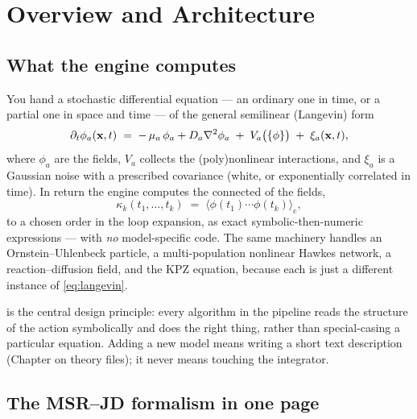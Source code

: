 \chapter{Overview and Architecture}
\label{ch:overview}

\section{What the engine computes}

You hand \Daedalus{} a stochastic differential equation --- an ordinary one in
time, or a partial one in space and time --- of the general semilinear
(Langevin) form
\begin{equation}
  \partial_t \phi_a(\mathbf x,t)
   \;=\; -\,\mu_a\,\phi_a + D_a \nabla^2 \phi_a
          \;+\; V_a\big(\{\phi\}\big) \;+\; \xi_a(\mathbf x,t),
  \label{eq:langevin}
\end{equation}
where $\phi_a$ are the fields, $V_a$ collects the (poly)nonlinear interactions,
and $\xi_a$ is a Gaussian noise with a prescribed covariance (white, or
exponentially correlated in time).  In return the engine computes the connected
 of the fields,
\begin{equation}
  \kappa_k(t_1,\dots,t_k)
    \;=\; \big\langle \phi(t_1)\cdots\phi(t_k)\big\rangle_{\mathrm c},
\end{equation}
to a chosen order in the loop expansion, as exact symbolic-then-numeric
expressions --- with \emph{no} model-specific code.  The same machinery handles
an Ornstein--Uhlenbeck particle, a multi-population nonlinear Hawkes network, a
reaction--diffusion field, and the KPZ equation, because each is just a different
instance of \eqref{eq:langevin}.

\begin{defn}
 is the central design principle: every algorithm in the
pipeline reads the structure of the action symbolically and does the right thing,
rather than special-casing a particular equation.  Adding a new model means
writing a short text description (Chapter on theory files); it never means
touching the integrator.
\end{defn}

\section{The MSR--JD formalism in one page}

